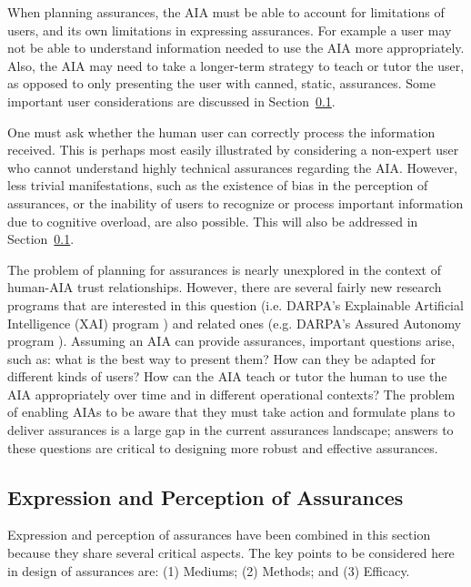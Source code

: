     When planning assurances, the AIA must be able to account for limitations of users, and its own limitations in expressing assurances. For example a user may not be able to understand information needed to use the AIA more appropriately. Also, the AIA may need to take a longer-term strategy to teach or tutor the user, as opposed to only presenting the user with canned, static, assurances. Some important user considerations are discussed in Section~\ref{sec:express_assurances}.
    
    One must ask whether the human user can correctly process the information received. This is perhaps most easily illustrated by considering a non-expert user who cannot understand highly technical assurances regarding the AIA. However, less trivial manifestations, such as the existence of bias in the perception of assurances, or the inability of users to recognize or process important information due to cognitive overload, are also possible. This will also be addressed in Section~\ref{sec:express_assurances}.

The problem of planning for assurances is nearly unexplored in the context of human-AIA trust relationships. However, there are several fairly new research programs that are interested in this question (i.e. DARPA's Explainable Artificial Intelligence (XAI) program \cite{Gunning2016-kb}) and related ones (e.g. DARPA's Assured Autonomy program \cite{Neema2017-bb}). Assuming an AIA can provide assurances, important questions arise, such as: what is the best way to present them? How can they be adapted for different kinds of users? How can the AIA teach or tutor the human to use the AIA appropriately over time and in different operational contexts? The problem of enabling AIAs to be aware that they must take action and formulate plans to deliver assurances is a large gap in the current assurances landscape; answers to these questions are critical to designing more robust and effective assurances.

\subsection{Expression and Perception of Assurances} \label{sec:express_assurances}
Expression and perception of assurances have been combined in this section because they share several critical aspects. The key points to be considered here in design of assurances are:
(1) Mediums; (2) Methods; and (3) Efficacy.     
    
